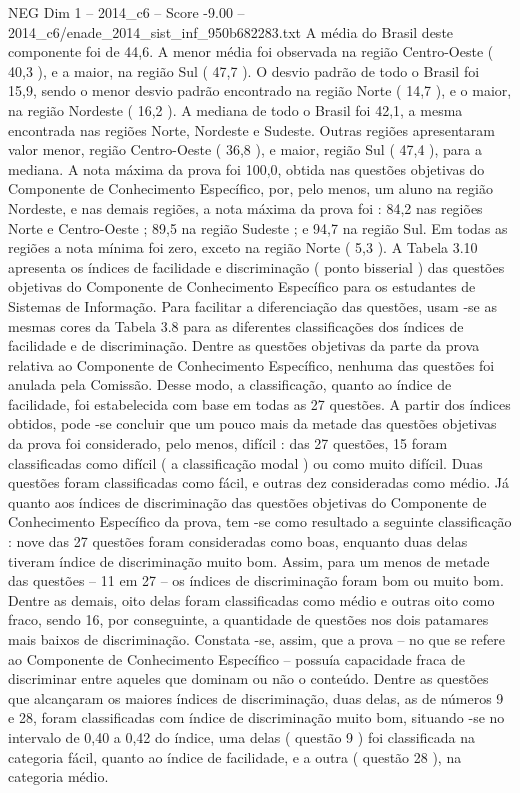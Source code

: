 \begin{textsample}{NEG Dim 1 – 2014\_c6 – Score -9.00 – 2014\_c6/enade\_2014\_sist\_inf\_950b682283.txt}
A média do Brasil deste componente foi de 44,6.
A menor média foi observada na região Centro-Oeste ( 40,3 ), e a maior, na região Sul ( 47,7 ).
O desvio padrão de todo o Brasil foi 15,9, sendo o menor desvio padrão encontrado na região Norte ( 14,7 ), e o maior, na região Nordeste ( 16,2 ).
A mediana de todo o Brasil foi 42,1, a mesma encontrada nas regiões Norte, Nordeste e Sudeste.
Outras regiões apresentaram valor menor, região Centro-Oeste ( 36,8 ), e maior, região Sul ( 47,4 ), para a mediana.
A nota máxima da prova foi 100,0, obtida nas questões objetivas do Componente de Conhecimento Específico, por, pelo menos, um aluno na região Nordeste, e nas demais regiões, a nota máxima da prova foi : 84,2 nas regiões Norte e Centro-Oeste ; 89,5 na região Sudeste ; e 94,7 na região Sul.
Em todas as regiões a nota mínima foi zero, exceto na região Norte ( 5,3 ).
A Tabela 3.10 apresenta os índices de facilidade e discriminação ( ponto bisserial ) das questões objetivas do Componente de Conhecimento Específico para os estudantes de Sistemas de Informação.
Para facilitar a diferenciação das questões, usam -se as mesmas cores da Tabela 3.8 para as diferentes classificações dos índices de facilidade e de discriminação.
Dentre as questões objetivas da parte da prova relativa ao Componente de Conhecimento Específico, nenhuma das questões foi anulada pela Comissão.
Desse modo, a classificação, quanto ao índice de facilidade, foi estabelecida com base em todas as 27 questões.
A partir dos índices obtidos, pode -se concluir que um pouco mais da metade das questões objetivas da prova foi considerado, pelo menos, difícil : das 27 questões, 15 foram classificadas como difícil ( a classificação modal ) ou como muito difícil.
Duas questões foram classificadas como fácil, e outras dez consideradas como médio.
Já quanto aos índices de discriminação das questões objetivas do Componente de Conhecimento Específico da prova, tem -se como resultado a seguinte classificação : nove das 27 questões foram consideradas como boas, enquanto duas delas tiveram índice de discriminação muito bom.
Assim, para um menos de metade das questões – 11 em 27 – os índices de discriminação foram bom ou muito bom.
Dentre as demais, oito delas foram classificadas como médio e outras oito como fraco, sendo 16, por conseguinte, a quantidade de questões nos dois patamares mais baixos de discriminação.
Constata -se, assim, que a prova – no que se refere ao Componente de Conhecimento Específico – possuía capacidade fraca de discriminar entre aqueles que dominam ou não o conteúdo.
Dentre as questões que alcançaram os maiores índices de discriminação, duas delas, as de números 9 e 28, foram classificadas com índice de discriminação muito bom, situando -se no intervalo de 0,40 a 0,42 do índice, uma delas ( questão 9 ) foi classificada na categoria fácil, quanto ao índice de facilidade, e a outra ( questão 28 ), na categoria médio.

\end{textsample}
